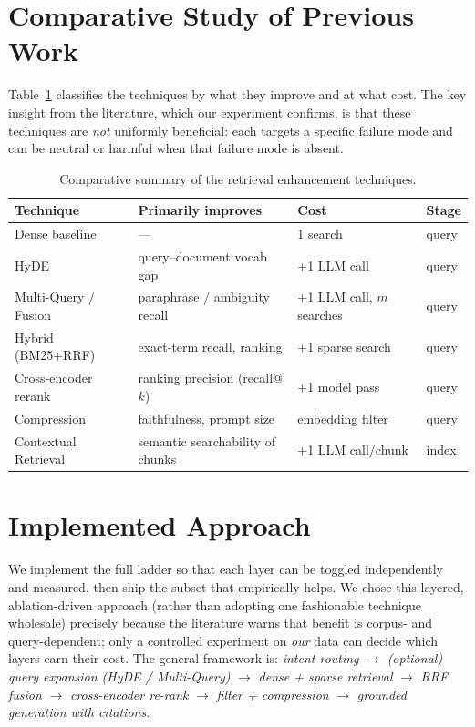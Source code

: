 \documentclass[12pt,a4paper]{report}
\begin{document}
\section{Comparative Study of Previous Work}
Table~\ref{tab:litcompare} classifies the techniques by what they improve and at
what cost. The key insight from the literature, which our experiment confirms, is
that these techniques are \emph{not} uniformly beneficial: each targets a specific
failure mode and can be neutral or harmful when that failure mode is absent.

\begin{table}[h]
\centering
\caption{Comparative summary of the retrieval enhancement techniques.}
\label{tab:litcompare}
\small
\begin{tabular}{@{}lp{4.3cm}p{3.6cm}l@{}}
\toprule
\textbf{Technique} & \textbf{Primarily improves} & \textbf{Cost} & \textbf{Stage}\\
\midrule
Dense baseline       & ---                                  & 1 search            & query \\
HyDE                 & query--document vocab gap            & +1 LLM call         & query \\
Multi-Query / Fusion & paraphrase / ambiguity recall        & +1 LLM call, $m$ searches & query \\
Hybrid (BM25+RRF)    & exact-term recall, ranking           & +1 sparse search    & query \\
Cross-encoder rerank & ranking precision (recall@$k$)       & +1 model pass       & query \\
Compression          & faithfulness, prompt size            & embedding filter    & query \\
Contextual Retrieval & semantic searchability of chunks     & +1 LLM call/chunk   & index \\
\bottomrule
\end{tabular}
\end{table}

\section{Implemented Approach}
We implement the full ladder so that each layer can be toggled independently and
measured, then ship the subset that empirically helps. We chose this layered,
ablation-driven approach (rather than adopting one fashionable technique
wholesale) precisely because the literature warns that benefit is corpus- and
query-dependent; only a controlled experiment on \emph{our} data can decide which
layers earn their cost. The general framework is: \emph{intent routing}
$\rightarrow$ \emph{(optional) query expansion (HyDE / Multi-Query)} $\rightarrow$
\emph{dense + sparse retrieval} $\rightarrow$ \emph{RRF fusion} $\rightarrow$
\emph{cross-encoder re-rank} $\rightarrow$ \emph{filter + compression}
$\rightarrow$ \emph{grounded generation with citations}.
\end{document}
